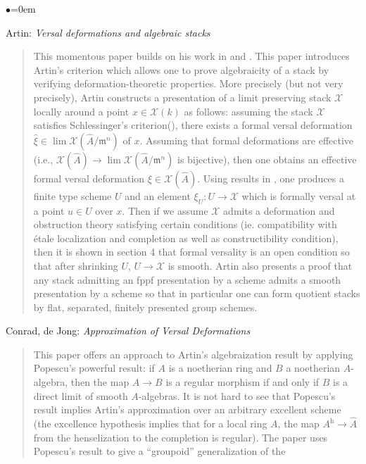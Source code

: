 \begin{list}{$\bullet$}{\leftmargin=0em}
\smallskip
\item
Artin: \emph{Versal deformations and algebraic stacks} \cite{artin_versal}
\begin{quote}
This momentous paper builds on his work in 
\cite{artin_approximation} and \cite{artin_algebraizationI}. This paper 
introduces Artin's criterion which allows one to prove algebraicity of a
stack by  verifying deformation-theoretic properties. More precisely (but
not very  precisely), Artin constructs a presentation of a limit preserving
stack  $\mathcal{X}$ 
locally around a point $x \in \mathcal{X}(k)$ as follows: assuming the stack 
$\mathcal{X}$ 
satisfies Schlessinger's criterion(\cite{Sch}), there exists a formal 
versal deformation
$\hat{\xi} \in \lim \mathcal{X}(\hat A / \mathfrak m^n)$ of 
$x$. Assuming  that formal deformations are effective (i.e.,
$\mathcal{X}(\hat{A}) \to \lim \mathcal{X}(\hat A  / \mathfrak m^n)$
is bijective), then one obtains an effective formal versal 
deformation $\xi \in \mathcal{X}(\hat A)$. Using results in 
\cite{artin_algebraizationI}, one produces a finite type scheme $U$ and an 
element $\xi_U: U \to \mathcal{X}$ which is formally versal at a point
$u \in U$ over $x$. Then if we assume $\mathcal{X}$ admits a deformation
and obstruction theory 
satisfying certain conditions (ie. compatibility with \'etale localization and 
completion as well as constructibility condition), then it is shown in section 
4 that formal versality is an open condition so that after shrinking $U$, $U 
\to \mathcal{X}$ is smooth.
Artin also presents a proof that any stack admitting an fppf presentation by 
a scheme admits a smooth presentation by a scheme so that in particular 
one can form quotient stacks by flat, separated, finitely presented group 
schemes.
\end{quote}
\smallskip
\item Conrad, de Jong: \emph{Approximation of Versal Deformations} 
\cite{conrad-dejong}
\begin{quote}
This paper offers an approach to Artin's algebraization result by applying 
Popescu's powerful result: if $A$ is a noetherian ring and $B$ a noetherian 
$A$-algebra, then the map $A \to B$ is a regular morphism if and only if $B$ 
is a direct limit of smooth $A$-algebras. It is not hard to see that Popescu's 
result implies Artin's approximation over an arbitrary excellent scheme (the 
excellence hypothesis implies that for a local ring $A$, the map $A^{\text{h}} 
\to \hat A$ from the henselization to the completion is regular).
The paper uses Popescu's result to give a ``groupoid'' generalization of the 

\end{quote}
\end{list}
